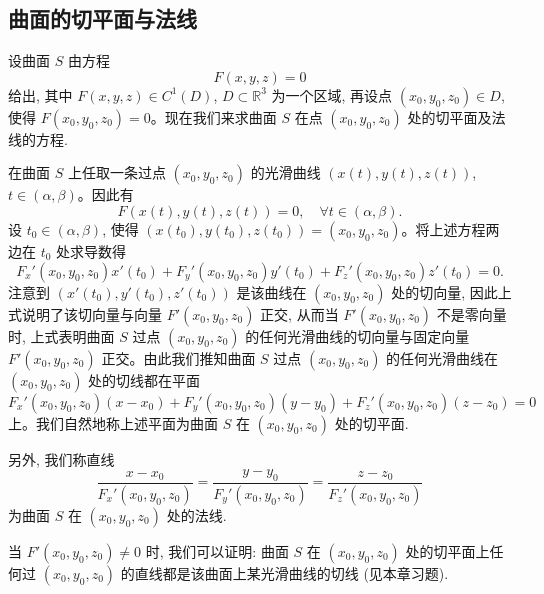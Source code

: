 \subsection{曲面的切平面与法线}
\label{subsec:ma-14-6-2}

设曲面 $S$ 由方程
\[
  F(x,y,z)=0
\]
给出, 其中 $F(x,y,z)\in C^1(D)$, $D\subset\mathbb R^3$ 为一个区域, 再设点 $(x_0,y_0,z_0)\in D$, 使得 $F(x_0,y_0,z_0)=0$。现在我们来求曲面 $S$ 在点 $(x_0,y_0,z_0)$ 处的切平面及法线的方程.

在曲面 $S$ 上任取一条过点 $(x_0,y_0,z_0)$ 的光滑曲线 $(x(t),y(t),z(t))$, $t\in(\alpha,\beta)$。因此有
\[
  F(x(t),y(t),z(t))=0,\quad \forall t\in(\alpha,\beta).
\]
设 $t_0\in(\alpha,\beta)$, 使得 $(x(t_0),y(t_0),z(t_0))=(x_0,y_0,z_0)$。将上述方程两边在 $t_0$ 处求导数得
\[
  F_x'(x_0,y_0,z_0)x'(t_0)+F_y'(x_0,y_0,z_0)y'(t_0)+F_z'(x_0,y_0,z_0)z'(t_0)=0.
\]
注意到 $(x'(t_0),y'(t_0),z'(t_0))$ 是该曲线在 $(x_0,y_0,z_0)$ 处的切向量, 因此上式说明了该切向量与向量 $F'(x_0,y_0,z_0)$ 正交, 从而当 $F'(x_0,y_0,z_0)$ 不是零向量时, 上式表明曲面 $S$ 过点 $(x_0,y_0,z_0)$ 的任何光滑曲线的切向量与固定向量 $F'(x_0,y_0,z_0)$ 正交。由此我们推知曲面 $S$ 过点 $(x_0,y_0,z_0)$ 的任何光滑曲线在 $(x_0,y_0,z_0)$ 处的切线都在平面
\[
  F_x'(x_0,y_0,z_0)(x-x_0)+F_y'(x_0,y_0,z_0)(y-y_0)+F_z'(x_0,y_0,z_0)(z-z_0)=0
\]
上。我们自然地称上述平面为曲面 $S$ 在 $(x_0,y_0,z_0)$ 处的切平面.

另外, 我们称直线
\[
  \frac{x-x_0}{F_x'(x_0,y_0,z_0)}
  =
  \frac{y-y_0}{F_y'(x_0,y_0,z_0)}
  =
  \frac{z-z_0}{F_z'(x_0,y_0,z_0)}
\]
为曲面 $S$ 在 $(x_0,y_0,z_0)$ 处的法线.

当 $F'(x_0,y_0,z_0)\ne0$ 时, 我们可以证明: 曲面 $S$ 在 $(x_0,y_0,z_0)$ 处的切平面上任何过 $(x_0,y_0,z_0)$ 的直线都是该曲面上某光滑曲线的切线 (见本章习题).

